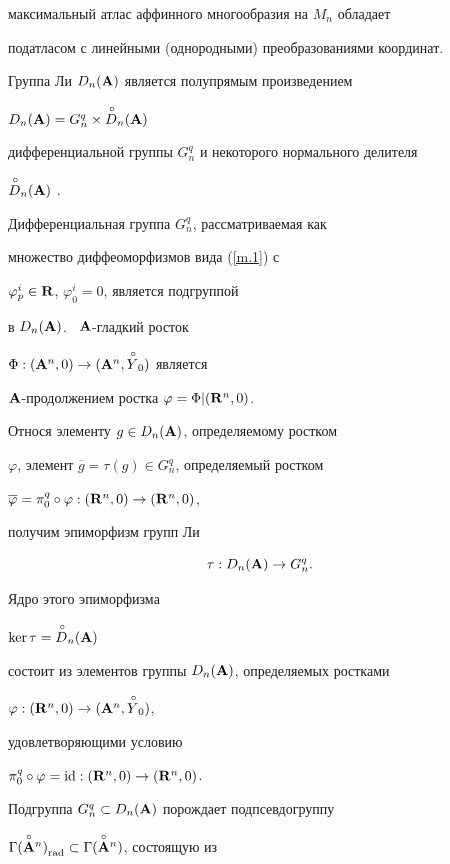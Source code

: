 максимальный атлас аффинного многообразия на $M_n$ обладает


податласом с линейными (однородными) преобразованиями координат.





Группа Ли $D_n({\bold A})$ является полупрямым произведением


$D_n({\bold A})=G^q_n\times{\overset{\,\circ}{D}{}}_n({\bold A})$


дифференциальной группы  $G^q_n$ и некоторого нормального делителя


${\overset{\,\circ}{D}{}}_n({\bold A})$ \cite{VSh8}.


Дифференциальная группа $G^q_n$, рассматриваемая как


множество диффеоморфизмов вида (\ref{m.1}) с


$\varphi^i_p\in{\bold R}$, $\varphi^i_0=0$, является подгруппой


в $D_n({\bold A})$. \ ${\bold A}$-гладкий росток


$\Phi:({\bold A}^n,0)\to({\bold A}^n,\overset{\,\circ}{Y}{}_0)$ является


${\bold A}$-продолжением ростка $\varphi=\Phi|({\bold R}^n,0)$.


Относя элементу $g\in D_n({\bold A})$, определяемому ростком


$\varphi$, элемент $\overline g=\tau(g)\in G^q_n$, определяемый ростком


$\overline\varphi={\pi^q_0}\circ\varphi:({\bold R}^n,0)\to({\bold R}^n,0)$,


получим эпиморфизм групп Ли


\begin{equation}


\tau:D_n(\A)\to G^q_n.


\label{f.6}


\end{equation}


Ядро этого эпиморфизма


$\ker\tau={\overset{\,\circ}{D}{}}_n({\bold A})$


состоит из  элементов группы $D_n({\bold A})$, определяемых ростками


$\varphi:({\bold R}^n,0)\to({\bold A}^n,\overset{\,\circ}{Y}{}_0)$,


удовлетворяющими условию


${\pi^q_0}\circ\varphi=\operatorname{id}:({\bold R}^n,0)\to({\bold R}^n,0)$.





Подгруппа $G^q_n\subset D_n({\bold A})$ порождает подпсевдогруппу


${\Gamma(\overset{\circ}{\bold A}{}^n)}_{\operatorname{rad}}\subset{\Gamma(\overset{\circ}{\bold A}{}^n)}$, состоящую из


